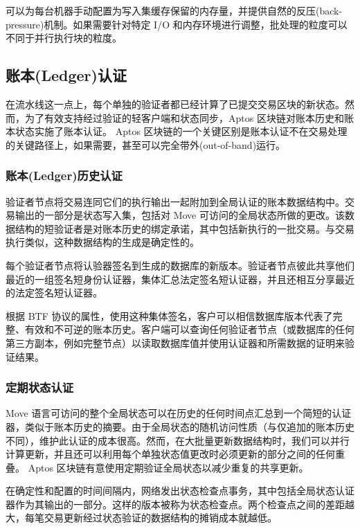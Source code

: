 \documentclass{article}
\begin{document}
可以为每台机器手动配置为写入集缓存保留的内存量，并提供自然的反压(back-pressure)机制。如果需要针对特定 I/O 和内存环境进行调整，批处理的粒度可以不同于并行执行块的粒度。

\subsection{账本(Ledger)认证}

在流水线这一点上，每个单独的验证者都已经计算了已提交交易区块的新状态。然而，为了有效支持经过验证的轻客户端和状态同步，Aptos 区块链对账本历史和账本状态实施了账本认证。 Aptos 区块链的一个关键区别是账本认证不在交易处理的关键路径上，如果需要，甚至可以完全带外(out-of-band)运行。

\subsubsection{账本(Ledger)历史认证}
\label{subsubsec:ledger_history_certification}

验证者节点将交易连同它们的执行输出一起附加到全局认证的账本数据结构中。交易输出的一部分是状态写入集，包括对 Move  可访问的全局状态所做的更改。该数据结构的短验证者是对账本历史的绑定承诺，其中包括新执行的一批交易。与交易执行类似，这种数据结构的生成是确定性的。

每个验证者节点将认验器签名到生成的数据库的新版本。验证者节点彼此共享他们最近的一组签名短身份认证器，集体汇总法定签名短认证器，并且还相互分享最近的法定签名短认证器。

根据 BTF 协议的属性，使用这种集体签名，客户可以相信数据库版本代表了完整、有效和不可逆的账本历史。客户端可以查询任何验证者节点（或数据库的任何第三方副本，例如完整节点）以读取数据库值并使用认证器和所需数据的证明来验证结果。

\subsubsection{定期状态认证}
\label{subsubsec:period_state_certification}

Move 语言可访问的整个全局状态可以在历史的任何时间点汇总到一个简短的认证器，类似于账本历史的摘要。由于全局状态的随机访问性质（与仅追加的账本历史不同），维护此认证的成本很高。然而，在大批量更新数据结构时，我们可以并行计算更新，并且还可以利用每个单独状态值更改时必须更新的部分之间的任何重叠。 Aptos 区块链有意使用定期验证全局状态以减少重复的共享更新。

在确定性和配置的时间间隔内，网络发出状态检查点事务，其中包括全局状态认证器作为其输出的一部分。这样的版本被称为状态检查点。两个检查点之间的差距越大，每笔交易更新经过状态验证的数据结构的摊销成本就越低。
\end{document}
